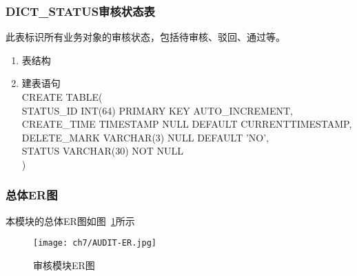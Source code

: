     \subsubsection{DICT\_STATUS审核状态表}
    此表标识所有业务对象的审核状态，包括待审核、驳回、通过等。
    \begin{enumerate}
        \item 表结构
        \begin{table}[htbp]
            \centering
            \end{table}
        \item 建表语句\\
            CREATE TABLE(\\
                STATUS\_ID INT(64) PRIMARY KEY AUTO\_INCREMENT,\\
                CREATE\_TIME TIMESTAMP NULL DEFAULT CURRENTTIMESTAMP,\\
                DELETE\_MARK VARCHAR(3) NULL DEFAULT 'NO',\\
                STATUS VARCHAR(30) NOT NULL\\
            )
        \end{enumerate}

\subsubsection{总体ER图}
本模块的总体ER图如图~\ref{fig:AUDIT-ER}所示
\begin{figure}[htbp]
    \centering
    \texttt{[image: ch7/AUDIT-ER.jpg]}
    \caption{审核模块ER图}\label{fig:AUDIT-ER}
    \vspace{\baselineskip} %
\end{figure}

